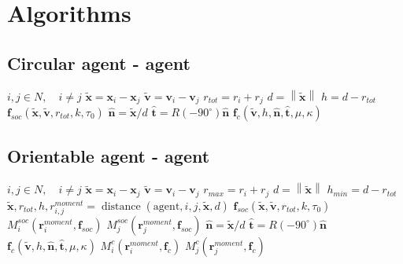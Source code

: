 \section{Algorithms}

\subsection{Circular agent - agent}
\begin{algorithmic}[1]
\ENSURE $ i,j \in N, \quad i \neq j $
\STATE $ \tilde{\mathbf{x}} = \mathbf{x}_{i} - \mathbf{x}_{j} $
\STATE $ \tilde{\mathbf{v}} = \mathbf{v}_{i} - \mathbf{v}_{j} $
\STATE $ r_{tot} = r_{i} + r_{j} $ 
\STATE $ d = \left\|\tilde{\mathbf{x}}\right\| $
\STATE $ h = d - r_{tot} $
\STATE
{}
\STATE $ \mathbf{f}_{soc}(\tilde{\mathbf{x}}, \tilde{\mathbf{v}}, r_{tot}, k, \tau_{0}) $
\ENDIF
\STATE
{}
\STATE $ \hat{\mathbf{n}} = \tilde{\mathbf{x}} / d $
\STATE $ \hat{\mathbf{t}} = R(-90^{\circ}) \hat{\mathbf{n}} $
\STATE $ \mathbf{f}_{c}(\tilde{\mathbf{v}}, h, \hat{\mathbf{n}}, \hat{\mathbf{t}}, \mu, \kappa) $
\ENDIF
\STATE $  $
\end{algorithmic}

\subsection{Orientable agent - agent}
\begin{algorithmic}[1]
\ENSURE $ i,j \in N, \quad i \neq j $
\STATE $ \tilde{\mathbf{x}} = \mathbf{x}_{i} - \mathbf{x}_{j} $
\STATE $ \tilde{\mathbf{v}} = \mathbf{v}_{i} - \mathbf{v}_{j} $
\STATE $ r_{max} = r_{i} + r_{j} $ 
\STATE $ d = \left\|\tilde{\mathbf{x}}\right\| $
\STATE $ h_{min} = d - r_{tot} $
\STATE 
{}
\STATE $ \tilde{\mathbf{x}}, r_{tot}, h, r_{i,j}^{moment} = \operatorname{distance}(\mathrm{agent}, i, j, \tilde{\mathbf{x}}, d) $
\STATE
{}
\STATE $ \mathbf{f}_{soc}(\tilde{\mathbf{x}}, \tilde{\mathbf{v}}, r_{tot}, k, \tau_{0}) $
\STATE $ M_{i}^{soc}(\mathbf{r}_{i}^{moment}, \mathbf{f}_{soc}) $
\STATE $ M_{j}^{soc}(\mathbf{r}_{j}^{moment}, \mathbf{f}_{soc}) $
\ENDIF
\STATE
{}
\STATE $ \hat{\mathbf{n}} = \tilde{\mathbf{x}} / d $
\STATE $ \hat{\mathbf{t}} = R(-90^{\circ}) \hat{\mathbf{n}} $
\STATE $ \mathbf{f}_{c}(\tilde{\mathbf{v}}, h, \hat{\mathbf{n}}, \hat{\mathbf{t}}, \mu, \kappa) $
\STATE $ M_{i}^{c}(\mathbf{r}_{i}^{moment}, \mathbf{f}_{c}) $
\STATE $ M_{j}^{c}(\mathbf{r}_{j}^{moment}, \mathbf{f}_{c}) $
\ENDIF
\ENDIF
\STATE $  $
\end{algorithmic}